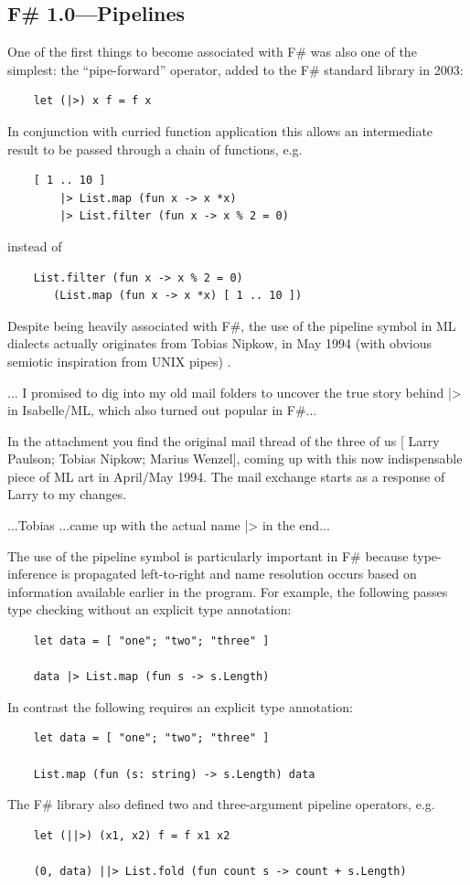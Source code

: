 \documentclass[acmsmall,screen]{acmart}
\begin{document}
\subsection*{F\# 1.0---Pipelines}

One of the first things to become associated with F\# was also one of the simplest: the “pipe-forward” operator, added to the F\# standard library in 2003:
\begin{verbatim}
    let (|>) x f = f x
\end{verbatim}
In conjunction with curried function application this allows an intermediate result to be passed through a chain of functions, e.g.
\begin{verbatim}
    [ 1 .. 10 ] 
        |> List.map (fun x -> x *x) 
        |> List.filter (fun x -> x % 2 = 0)
\end{verbatim}
instead of 
\begin{verbatim}
    List.filter (fun x -> x % 2 = 0) 
       (List.map (fun x -> x *x) [ 1 .. 10 ])
\end{verbatim}
Despite being heavily associated with F\#, the use of the pipeline symbol in ML dialects actually originates from Tobias Nipkow, in
May 1994 (with obvious semiotic inspiration from UNIX pipes) \citep{RefPipeline, RefIsabellInfix}.
\begin{verbquote}
... I promised to dig into my old mail folders to uncover the true story behind |> in Isabelle/ML, which also turned out popular in F#...

In the attachment you find the original mail thread of the three of us [ Larry Paulson; Tobias Nipkow; Marius Wenzel], coming up with this now indispensable piece of ML art in April/May 1994. The mail exchange starts as a response of Larry to my changes.  

...Tobias ...came up with the actual name |> in the end...
\end{verbquote}
The use of the pipeline symbol is particularly important in F\# because type-inference is propagated left-to-right and name resolution occurs based on information available earlier in the program.  For example, the following passes type checking without an explicit type annotation:
\begin{verbatim}
    let data = [ "one"; "two"; "three" ] 

    data |> List.map (fun s -> s.Length)
\end{verbatim}
In contrast the following requires an explicit type annotation:
\begin{verbatim}
    let data = [ "one"; "two"; "three" ] 

    List.map (fun (s: string) -> s.Length) data
\end{verbatim}
The F\# library also defined two and three-argument pipeline operators, e.g.
\begin{verbatim}
    let (||>) (x1, x2) f = f x1 x2

    (0, data) ||> List.fold (fun count s -> count + s.Length)
\end{verbatim}
\end{document}
